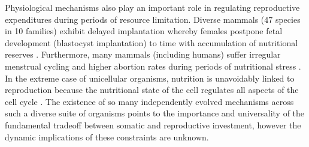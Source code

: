\documentclass{pnastwo}
\begin{document}
\begin{article}
Physiological mechanisms also play an important role in regulating reproductive expenditures during periods of resource limitation.
Diverse mammals (47 species in 10 families) exhibit delayed implantation whereby females postpone fetal development (blastocyst implantation) to time with accumulation of nutritional reserves \cite{Mead:1989dt,Sandell:1990kw}. %
Furthermore, many mammals (including humans) suffer irregular menstrual cycling and higher abortion rates during periods of nutritional stress \cite{Bulik:1999eo,Trites:2003cc}.
In the extreme case of unicellular organisms, nutrition is unavoidably linked to reproduction because the nutritional state of the cell regulates all aspects of the cell cycle \cite{Glazier:2009hq}.
The existence of so many independently evolved mechanisms across such a diverse suite of organisms points to the importance and universality of the fundamental tradeoff between somatic and reproductive investment, however the dynamic implications of these constraints are unknown.


\end{article}
\end{document}

